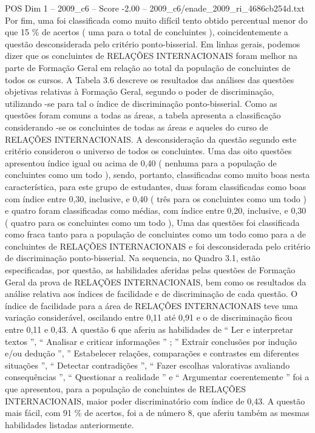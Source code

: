 \begin{textsample}{POS Dim 1 – 2009\_c6 – Score -2.00 – 2009\_c6/enade\_2009\_ri\_4686cb254d.txt}
Por fim, uma foi classificada como muito difícil tento obtido percentual menor do que 15 \% de acertos ( uma para o total de concluintes ), coincidentemente a questão desconsiderada pelo critério ponto-bisserial.
Em linhas gerais, podemos dizer que os concluintes de RELAÇÕES INTERNACIONAIS foram melhor na parte de Formação Geral em relação ao total da população de concluintes de todos os cursos.
A Tabela 3.6 descreve os resultados das análises das questões objetivas relativas à Formação Geral, segundo o poder de discriminação, utilizando -se para tal o índice de discriminação ponto-bisserial.
Como as questões foram comuns a todas as áreas, a tabela apresenta a classificação considerando -se os concluintes de todas as áreas e aqueles do curso de RELAÇÕES INTERNACIONAIS.
A desconsideração da questão segundo este critério considerou o universo de todos os concluintes.
Uma das oito questões apresentou índice igual ou acima de 0,40 ( nenhuma para a população de concluintes como um todo ), sendo, portanto, classificadas como muito boas nesta característica, para este grupo de estudantes, duas foram classificadas como boas com índice entre 0,30, inclusive, e 0,40 ( três para os concluintes como um todo ) e quatro foram classificadas como médias, com índice entre 0,20, inclusive, e 0,30 ( quatro para os concluintes como um todo ), Uma das questões foi classificada como fraca tanto para a população de concluintes como um todo como para a de concluintes de RELAÇÕES INTERNACIONAIS e foi desconsiderada pelo critério de discriminação ponto-bisserial.
Na sequencia, no Quadro 3.1, estão especificadas, por questão, as habilidades aferidas pelas questões de Formação Geral da prova de RELAÇÕES INTERNACIONAIS, bem como os resultados da análise relativa aos índices de facilidade e de discriminação de cada questão.
O índice de facilidade para a área de RELAÇÕES INTERNACIONAIS teve uma variação considerável, oscilando entre 0,11 até 0,91 e o de discriminação ficou entre 0,11 e 0,43.
A questão 6 que aferiu as habilidades de “ Ler e interpretar textos ”, “ Analisar e criticar informações ” ; ” Extrair conclusões por indução e/ou dedução ”, ” Estabelecer relações, comparações e contrastes em diferentes situações ”, “ Detectar contradições ”, “ Fazer escolhas valorativas avaliando consequências ”, “ Questionar a realidade ” e “ Argumentar coerentemente ” foi a que apresentou, para a população de concluintes de RELAÇÕES INTERNACIONAIS, maior poder discriminatório com índice de 0,43.
A questão mais fácil, com 91 \% de acertos, foi a de número 8, que aferiu também as mesmas habilidades listadas anteriormente.

\end{textsample}
